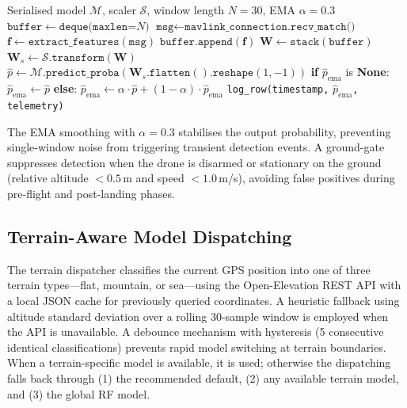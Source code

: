 \begin{algorithm}[H]
\caption{Streaming Anomaly Detection}
\label{alg:inference}
\begin{algorithmic}[1]
\Require Serialised model $\mathcal{M}$, scaler $\mathcal{S}$, window length $N=30$, EMA $\alpha=0.3$
\State $\texttt{buffer} \gets \texttt{deque(maxlen=}N\texttt{)}$
    \State $\texttt{msg} \gets \texttt{mavlink\_connection.recv\_match()}$
    \State $\mathbf{f} \gets \texttt{extract\_features}(\texttt{msg})$ 
    \State $\texttt{buffer.append}(\mathbf{f})$
        \State $\mathbf{W} \gets \texttt{stack}(\texttt{buffer})$ 
        \State $\mathbf{W}_s \gets \mathcal{S}.\texttt{transform}(\mathbf{W})$ 
        \State $\hat{p} \gets \mathcal{M}.\texttt{predict\_proba}(\mathbf{W}_s.\texttt{flatten}().\texttt{reshape}(1, -1))$ 
        \State \textbf{if} $\hat{p}_{\text{ema}}$ is \textbf{None}: $\hat{p}_{\text{ema}} \gets \hat{p}$
        \State \textbf{else}: $\hat{p}_{\text{ema}} \gets \alpha \cdot \hat{p} + (1 - \alpha) \cdot \hat{p}_{\text{ema}}$
        \State \texttt{log\_row(timestamp,} $\hat{p}_{\text{ema}}$\texttt{, telemetry)}
    \EndIf
\EndWhile
\end{algorithmic}
\end{algorithm}

The EMA smoothing with \(\alpha = 0.3\) stabilises the output probability, preventing single-window noise from triggering transient detection events. A ground-gate suppresses detection when the drone is disarmed or stationary on the ground (relative altitude $< 0.5$\,m and speed $< 1.0$\,m/s), avoiding false positives during pre-flight and post-landing phases.

\subsection{Terrain-Aware Model Dispatching}

The terrain dispatcher classifies the current GPS position into one of three terrain types---flat, mountain, or sea---using the Open-Elevation REST API with a local JSON cache for previously queried coordinates. A heuristic fallback using altitude standard deviation over a rolling 30-sample window is employed when the API is unavailable. A debounce mechanism with hysteresis (5 consecutive identical classifications) prevents rapid model switching at terrain boundaries. When a terrain-specific model is available, it is used; otherwise the dispatching falls back through (1) the recommended default, (2) any available terrain model, and (3) the global RF model.

